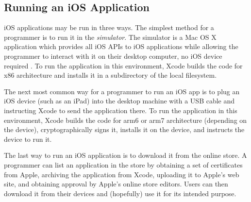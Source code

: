 \subsection{Running an iOS Application}

iOS applications may be run in three ways. The simplest method for a programmer
is to run it in the \emph{simulator}. The simulator is a Mac OS X application
which provides all iOS APIs to iOS applications while allowing the programmer to
interact with it on their desktop computer, no iOS device required
\cite{ios:application-programming-guide}. To run the application in this
environment, Xcode builds the code for x86 architecture and installs it in a
subdirectory of the local filesystem.

The next most common way for a programmer to run an iOS app is to plug an iOS
device (such as an iPad) into the desktop machine with a USB cable and
instructing Xcode to send the application there. To run the application in this
environment, Xcode builds the code for arm6 or arm7 architecture (depending on
the device), cryptographically signs it, installs it on the device, and
instructs the device to run it.

The last way to run an iOS application is to download it from the online store.
A programmer can list an application in the store by obtaining a set of
certificates from Apple, archiving the application from Xcode, uploading it to
Apple's web site, and obtaining approval by Apple's online store editors. Users
can then download it from their devices and (hopefully) use it for its intended
purpose.
